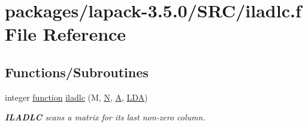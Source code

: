 \hypertarget{iladlc_8f}{}\section{packages/lapack-\/3.5.0/\+S\+R\+C/iladlc.f File Reference}
\label{iladlc_8f}
\subsection*{Functions/\+Subroutines}
\begin{DoxyCompactItemize}
\item 
integer \hyperlink{afunc_8m_a7b5e596df91eadea6c537c0825e894a7}{function} \hyperlink{group__auxOTHERauxiliary_gab8b3783390380038c9d26de61d7aefb4}{iladlc} (M, \hyperlink{polmisc_8c_a0240ac851181b84ac374872dc5434ee4}{N}, \hyperlink{classA}{A}, \hyperlink{example__user_8c_ae946da542ce0db94dced19b2ecefd1aa}{L\+D\+A})
\begin{DoxyCompactList}\small\item\em {\bfseries I\+L\+A\+D\+L\+C} scans a matrix for its last non-\/zero column. \end{DoxyCompactList}\end{DoxyCompactItemize}

